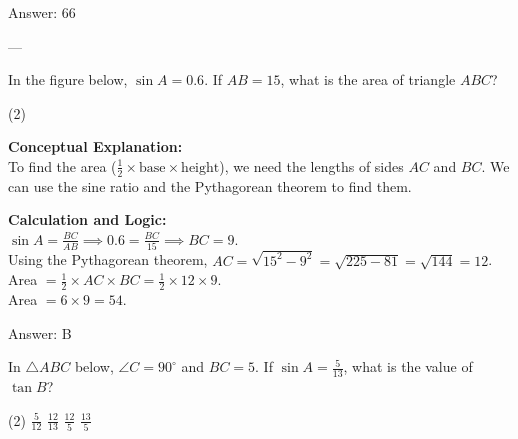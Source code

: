 \documentclass[11pt,paper=a4,answers]{exam}
\begin{document}
\begin{questions}
\begin{solution}
\vspace{15pt}
Answer: \colorbox{yellow!100}{66}
\end{solution}

---

\question
In the figure below, $\sin A = 0.6$. If $AB = 15$, what is the area of triangle $ABC$?
\begin{center}
\end{center}
\begin{tasks}(2)
\end{tasks}

\begin{solution}
\textbf{Conceptual Explanation:} \\
To find the area ($\frac{1}{2} \times \text{base} \times \text{height}$), we need the lengths of sides $AC$ and $BC$. We can use the sine ratio and the Pythagorean theorem to find them.

\vspace{10pt}
\textbf{Calculation and Logic:} \\
$\sin A = \frac{BC}{AB} \implies 0.6 = \frac{BC}{15} \implies BC = 9$. \\
Using the Pythagorean theorem, $AC = \sqrt{15^2 - 9^2} = \sqrt{225 - 81} = \sqrt{144} = 12$. \\
Area $= \frac{1}{2} \times AC \times BC = \frac{1}{2} \times 12 \times 9$. \\
Area $= 6 \times 9 = 54$.

\vspace{15pt}
Answer: \colorbox{yellow!100}{B}
\end{solution}


\question
In $\triangle ABC$ below, $\angle C = 90^\circ$ and $BC = 5$. If $\sin A = \frac{5}{13}$, what is the value of $\tan B$?
\begin{center}
\end{center}
\begin{tasks}(2)
    \task $\frac{5}{12}$
    \task $\frac{12}{13}$
    \task $\frac{12}{5}$
    \task $\frac{13}{5}$
\end{tasks}


\end{questions}
\end{document}
